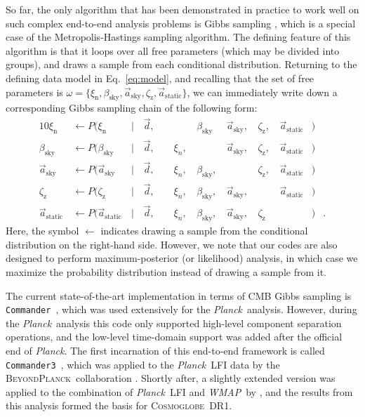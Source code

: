 \documentclass{aa}
\def\Cosmoglobe{\textsc{Cosmoglobe}}
\def\commanderthree{\texttt{Commander3}}
\def\commander{\texttt{Commander}}
\def\Planck{\textit{Planck}}
\def\WMAP{\textit{WMAP}}
\newcommand{\dv}[0]{\vec{d}}
\renewcommand{\a}[0]{\vec{a}}
\newcommand{\BP}{\textsc{BeyondPlanck}}
\begin{document}
So far, the only algorithm that has been demonstrated in practice to
work well on such complex end-to-end analysis problems
\citep{bp01,watts2023_dr1} is Gibbs sampling
\citep[e.g.,][]{geman:1984}, which is a special case of the
Metropolis-Hastings sampling algorithm. The defining
feature of this algorithm is that it loops over all free parameters
(which may be divided into groups), and draws a sample from each
conditional distribution. Returning to the defining data model in
Eq.~\eqref{eq:model}, and recalling that the set of
free parameters is $\omega = \{\xi_{\mathrm{n}},
\beta_{\mathrm{sky}},\a_{\mathrm{sky}},\zeta_{\mathrm{z}},\a_{\mathrm{static}}\}$,
we can immediately write down a corresponding Gibbs sampling chain of
the following form:
\begin{alignat}{10}
\xi_{\mathrm{n}} &\,\leftarrow P(\xi_{\mathrm{n}}&\,\mid &\,\dv,&\, &\,\phantom{\xi_n} &
\,\beta_{\mathrm{sky}}& \,\a_{\mathrm{sky}}, &\,\zeta_{\mathrm{z}},
&\,\a_{\mathrm{static}}&)\label{eq:gibbs_n}\\
\beta_{\mathrm{sky}} &\,\leftarrow P(\beta_{\mathrm{sky}}&\,\mid &\,\dv,&\, &\,\xi_n, &
\,\phantom{\beta_{\mathrm{sky}}}& \,\a_{\mathrm{sky}}, &\,\zeta_{\mathrm{z}}, &\,\a_{\mathrm{static}}&)\\
\a_{\mathrm{sky}} &\,\leftarrow P(\a_{\mathrm{sky}}&\,\mid &\,\dv,&\, &\,\xi_n, &
\,\beta_{\mathrm{sky}},& \,\phantom{\a_{\mathrm{sky}},}
&\,\zeta_{\mathrm{z}}, &\,\a_{\mathrm{static}}&)\\
\zeta_{\mathrm{z}} &\,\leftarrow P(\zeta_{\mathrm{z}}&\,\mid &\,\dv,&\, &\,\xi_n, &
\,\beta_{\mathrm{sky}},& \,\a_{\mathrm{sky}},
&\,\phantom{\zeta_{\mathrm{z}},} &\,\a_{\mathrm{static}}&)\label{eq:gibbs_zodi}\\
\a_{\mathrm{static}} &\,\leftarrow P(\a_{\mathrm{static}}&\,\mid &\,\dv,&\, &\,\xi_n, &
	\,\beta_{\mathrm{sky}},& \,\a_{\mathrm{sky}}, &\,\zeta_{\mathrm{z}} &\,\phantom{\a_{\mathrm{static}}}&)&.\label{eq:gibbs_static}
\end{alignat}
Here, the symbol $\leftarrow$ indicates drawing a sample from the
conditional distribution on the right-hand side. However, we note that
our codes are also designed to perform maximum-posterior (or
likelihood) analysis, in which case we maximize the probability
distribution instead of drawing a sample from it.

The current state-of-the-art implementation in terms of CMB Gibbs sampling
is \commander\ \citep{eriksen:2004}, which was used
extensively for the \Planck\ analysis. However, during the
\Planck\ analysis this code only supported high-level component
separation operations, and the low-level time-domain support was added
after the official end of \Planck. The first incarnation of this
end-to-end framework is called \commanderthree\ \citep{bp03}, which
was applied to the \Planck\ LFI data by the \BP\ collaboration
\citep{bp01}. Shortly after, a slightly extended version was applied
to the combination of \Planck\ LFI and \WMAP\ by
\citet{watts2023_dr1}, and the results from this analysis formed the
basis for \Cosmoglobe\ DR1. 
\end{document}
